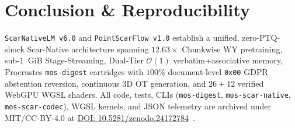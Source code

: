 \documentclass[10pt,twocolumn]{article}
\begin{document}
\section{Conclusion \& Reproducibility}
\texttt{ScarNativeLM v6.0} and \texttt{PointScarFlow v1.0} establish a unified, zero-PTQ-shock Scar-Native architecture spanning $12.63\times$ Chunkwise WY pretraining, sub-$1$~GiB Stage-Streaming, Dual-Tier $\mathcal{O}(1)$ verbatim+associative memory, Procrustes \texttt{mos-digest} cartridges with $100\%$ document-level \texttt{0x00} GDPR abstention reversion, continuous 3D OT generation, and $26+12$ verified WebGPU WGSL shaders. All code, tests, CLIs (\texttt{mos-digest}, \texttt{mos-scar-native}, \texttt{mos-scar-codec}), WGSL kernels, and JSON telemetry are archived under MIT/CC-BY-4.0 at \href{https://doi.org/10.5281/zenodo.24172784}{DOI: 10.5281/zenodo.24172784}~\citep{reisfilho2026mos_zenodo}.



\end{document}
